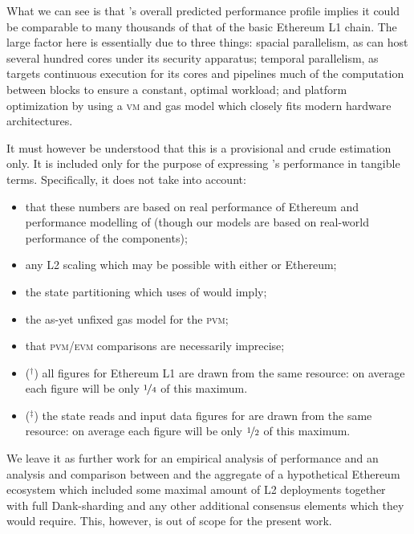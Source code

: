 What we can see is that \Jam's overall predicted performance profile implies it could be comparable to many thousands of that of the basic Ethereum L1 chain. The large factor here is essentially due to three things: spacial parallelism, as \Jam can host several hundred cores under its security apparatus; temporal parallelism, as \Jam targets continuous execution for its cores and pipelines much of the computation between blocks to ensure a constant, optimal workload; and platform optimization by using a \textsc{vm} and gas model which closely fits modern hardware architectures.

It must however be understood that this is a provisional and crude estimation only. It is included only for the purpose of expressing \Jam's performance in tangible terms. Specifically, it does not take into account:
\begin{itemize}
  \item that these numbers are based on real performance of Ethereum and performance modelling of \Jam (though our models are based on real-world performance of the components);
  \item any L2 scaling which may be possible with either \Jam or Ethereum;
  \item the state partitioning which uses of \Jam would imply;
  \item the as-yet unfixed gas model for the \textsc{pvm};
  \item that \textsc{pvm}/\textsc{evm} comparisons are necessarily imprecise;
  \item (${}^\dagger$) all figures for Ethereum L1 are drawn from the same resource: on average each figure will be only $\nicefrac{1}{4}$ of this maximum.
  \item (${}^\ddagger$) the state reads and input data figures for \Jam are drawn from the same resource: on average each figure will be only $\nicefrac{1}{2}$ of this maximum.
\end{itemize}

We leave it as further work for an empirical analysis of performance and an analysis and comparison between \Jam and the aggregate of a hypothetical Ethereum ecosystem which included some maximal amount of L2 deployments together with full Dank-sharding and any other additional consensus elements which they would require. This, however, is out of scope for the present work.

